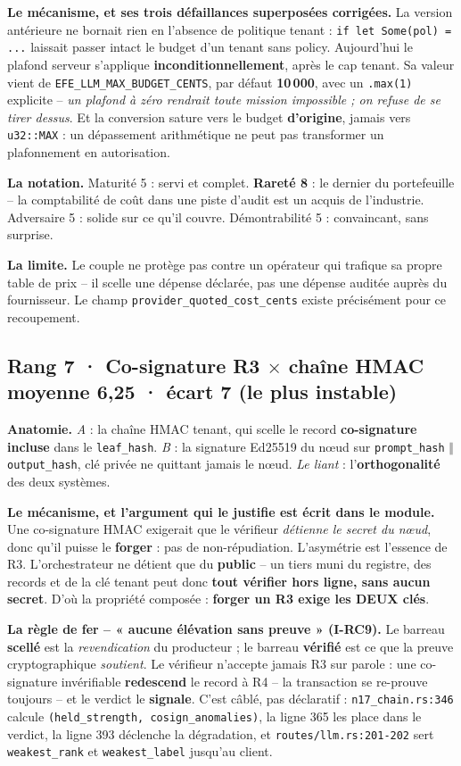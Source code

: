 \documentclass[10pt]{article}
\newcommand{\pire}[1]{{\color{red}\textbf{#1}}}
\newcommand{\sz}[1]{{\small\color{grey}\textsf{#1}}}
\newcommand{\code}[1]{\texttt{\small #1}}
\newcommand{\x}{$\times$}
\newcommand{\couple}[4]{%
  \subsection{#1 · #2 \hfill {\normalsize\color{grey}moyenne \textbf{#3} · écart #4}}}
\begin{document}
\textbf{Le mécanisme, et ses trois défaillances superposées corrigées.} La version antérieure ne
bornait rien en l'absence de politique tenant : \code{if let Some(pol) = ...} laissait passer intact
le budget d'un tenant sans policy. Aujourd'hui le plafond serveur s'applique \textbf{inconditionnellement},
après le cap tenant. Sa valeur vient de \code{EFE\_LLM\_MAX\_BUDGET\_CENTS}, par défaut
\textbf{10\,000}, avec un \code{.max(1)} explicite -- \emph{un plafond à zéro rendrait toute mission
impossible ; on refuse de se tirer dessus}. Et la conversion sature vers le budget \textbf{d'origine},
jamais vers \code{u32::MAX} : un dépassement arithmétique ne peut pas transformer un plafonnement en
autorisation.

\textbf{La notation.} \sz{Maturité 5} : servi et complet. \pire{Rareté 8} : le dernier du portefeuille
-- la comptabilité de coût dans une piste d'audit est un acquis de l'industrie. \sz{Adversaire 5} :
solide sur ce qu'il couvre. \sz{Démontrabilité 5} : convaincant, sans surprise.

\textbf{La limite.} Le couple ne protège pas contre un opérateur qui trafique sa propre table de prix
-- il scelle une dépense déclarée, pas une dépense auditée auprès du fournisseur. Le champ
\code{provider\_quoted\_cost\_cents} existe précisément pour ce recoupement.

\couple{Rang 7}{Co-signature R3 \x{} chaîne HMAC}{6,25}{7 \sz{(le plus instable)}}

\textbf{Anatomie.} \emph{A} : la chaîne HMAC tenant, qui scelle le record \textbf{co-signature
incluse} dans le \code{leaf\_hash}. \emph{B} : la signature Ed25519 du n\oe ud sur
\code{prompt\_hash} $\Vert$ \code{output\_hash}, clé privée ne quittant jamais le n\oe ud. \emph{Le
liant} : l'\textbf{orthogonalité} des deux systèmes.

\textbf{Le mécanisme, et l'argument qui le justifie est écrit dans le module.} Une co-signature HMAC
exigerait que le vérifieur \emph{détienne le secret du n\oe ud}, donc qu'il puisse le \textbf{forger} :
pas de non-répudiation. L'asymétrie est l'essence de R3. L'orchestrateur ne détient que du
\textbf{public} -- un tiers muni du registre, des records et de la clé tenant peut donc \textbf{tout
vérifier hors ligne, sans aucun secret}. D'où la propriété composée : \textbf{forger un R3 exige les
DEUX clés}.

\textbf{La règle de fer -- « aucune élévation sans preuve » (I-RC9).} Le barreau \textbf{scellé} est la
\emph{revendication} du producteur ; le barreau \textbf{vérifié} est ce que la preuve cryptographique
\emph{soutient}. Le vérifieur n'accepte jamais R3 sur parole : une co-signature invérifiable
\textbf{redescend} le record à R4 -- la transaction se re-prouve toujours -- et le verdict le
\textbf{signale}. C'est câblé, pas déclaratif : \code{n17\_chain.rs:346} calcule
\code{(held\_strength, cosign\_anomalies)}, la ligne 365 les place dans le verdict, la ligne 393
déclenche la dégradation, et \code{routes/llm.rs:201-202} sert \code{weakest\_rank} et
\code{weakest\_label} jusqu'au client.
\end{document}
